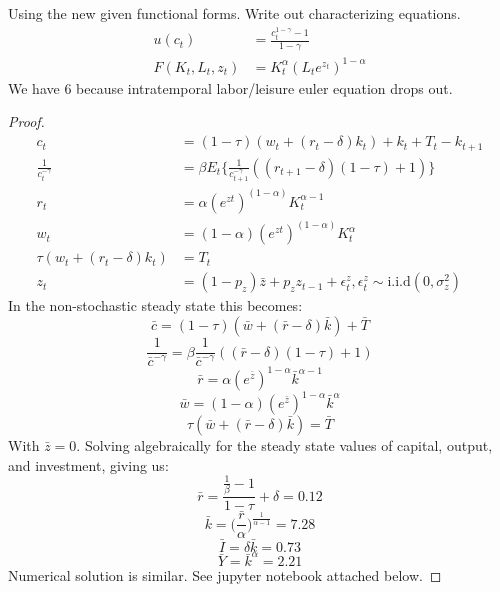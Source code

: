 \documentclass[12pt]{article}
\newenvironment{problem}[2][Problem]{\begin{trivlist}
\item[\hskip \labelsep {\bfseries #1}\hskip \labelsep {\bfseries #2.}]}{\end{trivlist}}
\begin{document}

\begin{problem}{5}
Using the new given functional forms. Write out characterizing equations.
\begin{equation}\label{DSGE_HW_NoLeisure_eq01}
\begin{split}
u(c_t) & = \frac{c^{1-\gamma}_t -1}{1-\gamma}      \\
F(K_t,L_t,z_t) & = K^{\alpha}_t (L_te^{z_t})^{1-\alpha}  \nonumber
\end{split}
\end{equation}
We have 6 because intratemporal labor/leisure euler equation drops out.
\begin{proof}
\begin{align*}
c_t &= (1-\tau)(w_t+ (r_t -\delta)k_t) + k_t + T_t - k_{t+1} \\
\frac{1}{c_t^{-\gamma}} &= \beta E_t \big\{ \frac{1}{c_{t+1}^{-\gamma}}((r_{t+1} - \delta)(1-\tau)+ 1) \big\} \\
r_t &= \alpha (e^{zt})^{(1-\alpha)} K_t^{\alpha-1} \\
w_t &= (1-\alpha) (e^{zt})^{(1-\alpha)} K_t^{\alpha} \\
\tau(w_t + (r_t -\delta)k_t) &= T_t \\
z_t &= (1-p_z)\bar{z} + p_zz_{t-1} + \epsilon^z_t,  \epsilon^z_t \sim \text{i.i.d}(0, \sigma^2_z)
\end{align*}
In the non-stochastic steady state this becomes:
$$\bar{c} = (1-\tau)(\bar{w} + (\bar{r} -\delta)\bar{k}) + \bar{T}$$
$$\frac{1}{\bar{c}^{-\gamma}} = \beta \frac{1}{\bar{c}^{-\gamma}}((\bar{r} - \delta)(1-\tau)+ 1) $$
$$\bar{r} = \alpha (e^{\bar{z}})^{1-\alpha} \bar{k}^{\alpha-1} $$
$$\bar{w} = (1-\alpha) (e^{\bar{z}})^{1-\alpha} \bar{k}^{\alpha} $$
$$\tau(\bar{w} + (\bar{r} -\delta)\bar{k}) =  \bar{T}$$
With $\bar{z} = 0$. Solving algebraically for the steady state values of capital, output, and investment, giving us:
$$\bar{r} = \frac{\frac{1}{\beta}-1}{1-\tau} + \delta = 0.12$$
$$\bar{k} = \big(\frac{\bar{r}}{\alpha}\big)^\frac{1}{\alpha-1} = 7.28$$
$$\bar{I} = \delta \bar{k} = 0.73$$
$$\bar{Y} = \bar{k}^\alpha = 2.21$$
Numerical solution is similar. See jupyter notebook attached below.
\end{proof}
\end{problem}

\end{document}
